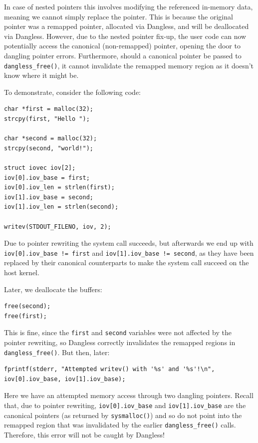 In case of nested pointers this involves modifying the referenced in-memory data, meaning we cannot simply replace the pointer. This is because the original pointer was a remapped pointer, allocated via Dangless, and will be deallocated via Dangless. However, due to the nested pointer fix-up, the user code can now potentially access the canonical (non-remapped) pointer, opening the door to dangling pointer errors. Furthermore, should a canonical pointer be passed to \lstinline!dangless_free()!, it cannot invalidate the remapped memory region as it doesn't know where it might be.

To demonstrate, consider the following code:

\begin{lstlisting}
char *first = malloc(32);
strcpy(first, "Hello ");

char *second = malloc(32);
strcpy(second, "world!");

struct iovec iov[2];
iov[0].iov_base = first;
iov[0].iov_len = strlen(first);
iov[1].iov_base = second;
iov[1].iov_len = strlen(second);

writev(STDOUT_FILENO, iov, 2);
\end{lstlisting}

Due to pointer rewriting the system call succeeds, but afterwards we end up with \lstinline|iov[0].iov_base != first| and \lstinline|iov[1].iov_base != second|, as they have been replaced by their canonical counterparts to make the system call succeed on the host kernel.

Later, we deallocate the buffers:

\begin{lstlisting}
free(second);
free(first);
\end{lstlisting}

This is fine, since the \lstinline!first! and \lstinline!second! variables were not affected by the pointer rewriting, so Dangless correctly invalidates the remapped regions in \lstinline!dangless_free()!. But then, later:

\begin{lstlisting}
fprintf(stderr, "Attempted writev() with '%s' and '%s'!\n", iov[0].iov_base, iov[1].iov_base);
\end{lstlisting}

Here we have an attempted memory access through two dangling pointers. Recall that, due to pointer rewriting, \lstinline|iov[0].iov_base| and \lstinline|iov[1].iov_base| are the canonical pointers (as returned by \lstinline!sysmalloc()!) and so do not point into the remapped region that was invalidated by the earlier \lstinline!dangless_free()! calls. Therefore, this error will not be caught by Dangless!

